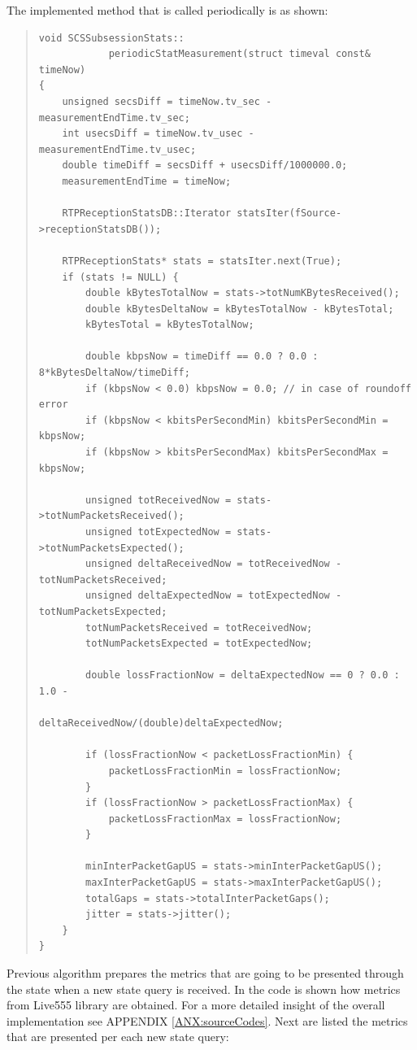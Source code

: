 The implemented method that is called periodically is as shown:

\begin{quote}
\begin{verbatim}
void SCSSubsessionStats::
			periodicStatMeasurement(struct timeval const& timeNow) 
{
    unsigned secsDiff = timeNow.tv_sec - measurementEndTime.tv_sec;
    int usecsDiff = timeNow.tv_usec - measurementEndTime.tv_usec;
    double timeDiff = secsDiff + usecsDiff/1000000.0;
    measurementEndTime = timeNow;

    RTPReceptionStatsDB::Iterator statsIter(fSource->receptionStatsDB());

    RTPReceptionStats* stats = statsIter.next(True);
    if (stats != NULL) {
        double kBytesTotalNow = stats->totNumKBytesReceived();
        double kBytesDeltaNow = kBytesTotalNow - kBytesTotal;
        kBytesTotal = kBytesTotalNow;

        double kbpsNow = timeDiff == 0.0 ? 0.0 : 8*kBytesDeltaNow/timeDiff;
        if (kbpsNow < 0.0) kbpsNow = 0.0; // in case of roundoff error
        if (kbpsNow < kbitsPerSecondMin) kbitsPerSecondMin = kbpsNow;
        if (kbpsNow > kbitsPerSecondMax) kbitsPerSecondMax = kbpsNow;

        unsigned totReceivedNow = stats->totNumPacketsReceived();
        unsigned totExpectedNow = stats->totNumPacketsExpected();
        unsigned deltaReceivedNow = totReceivedNow - totNumPacketsReceived;
        unsigned deltaExpectedNow = totExpectedNow - totNumPacketsExpected;
        totNumPacketsReceived = totReceivedNow;
        totNumPacketsExpected = totExpectedNow;

        double lossFractionNow = deltaExpectedNow == 0 ? 0.0 : 1.0 -
        							 deltaReceivedNow/(double)deltaExpectedNow;

        if (lossFractionNow < packetLossFractionMin) {
            packetLossFractionMin = lossFractionNow;
        }
        if (lossFractionNow > packetLossFractionMax) {
            packetLossFractionMax = lossFractionNow;
        }

        minInterPacketGapUS = stats->minInterPacketGapUS();
        maxInterPacketGapUS = stats->maxInterPacketGapUS();
        totalGaps = stats->totalInterPacketGaps();
        jitter = stats->jitter();
    }
}
\end{verbatim}
\end{quote} 

Previous algorithm prepares the metrics that are going to be presented through the state when a new state query is received. In the code is shown how metrics from Live555 library are obtained. For a more detailed insight of the overall implementation see APPENDIX \ref{ANX:sourceCodes}. Next are listed the metrics that are presented per each new state query:

